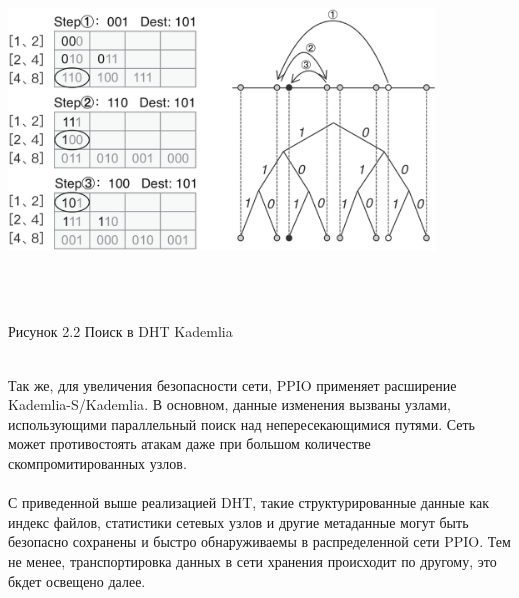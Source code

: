 \documentclass[10pt,a4paper]{article}
\begin{document}
 \vspace{-0.3em}
  \\
\\ \centerline{\includegraphics[width=320pt]{fig2}}
\\\\ \centerline{{Рисунок 2.2 Поиск в DHT Kademlia}}
\vspace{-0.5em}
\\
Так же, для увеличения безопасности сети, PPIO применяет расширение Kademlia-S/Kademlia\cite{article23}. В основном, данные изменения вызваны узлами, использующими параллельный поиск над непересекающимися путями.  Сеть может противостоять атакам даже при большом количестве скомпромитированных узлов.
\vspace{-0.5em}
\\ \\С приведенной выше реализацией DHT, такие структурированные данные как индекс файлов, статистики сетевых узлов и другие метаданные могут быть безопасно сохранены и быстро обнаруживаемы в  распределенной сети PPIO. Тем не менее, транспортировка данных в сети хранения происходит по другому, это бкдет освещено далее.
  \vspace{-0.5em}
\end{document}

